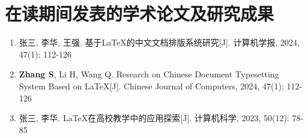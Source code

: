 \section*{在读期间发表的学术论文及研究成果}

\begin{enumerate}
\item 张三, 李华, 王强. 基于LaTeX的中文文档排版系统研究[J]. 计算机学报, 2024, 47(1): 112-126

\item \textbf{Zhang S}, Li H, Wang Q. Research on Chinese Document Typesetting System Based on LaTeX[J]. Chinese Journal of Computers, 2024, 47(1): 112-126

\item 张三, 李华. LaTeX在高校教学中的应用探索[J]. 计算机科学, 2023, 50(12): 78-85
\end{enumerate}